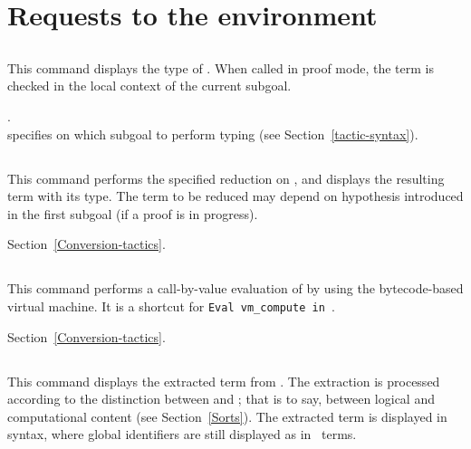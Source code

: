 \section{Requests to the environment}

\subsection[\tt Check {\term}.]{}
This command displays the type of {\term}. When called in proof mode, 
the term is checked in the local context of the current subgoal.

\begin{Variants}
\item {}.\\ %
specifies on which subgoal to perform typing (see
  Section~\ref{tactic-syntax}).
\end{Variants}


\subsection[\tt Eval {\rm\sl convtactic} in {\term}.]{}

This command performs the specified reduction on {\term}, and displays
the resulting term with its type. The term to be reduced may depend on
hypothesis introduced in the first subgoal (if a proof is in
progress).

\SeeAlso Section~\ref{Conversion-tactics}.

\subsection[\tt Compute {\term}.]{}

This command performs a call-by-value evaluation of {\term} by using
the bytecode-based virtual machine. It is a shortcut for
{\tt Eval vm\_compute in {\term}}.

\SeeAlso Section~\ref{Conversion-tactics}.

\subsection[\tt Extraction \term.]{}
This command displays the extracted term from
{\term}. The extraction is processed according to the distinction
between {\Set} and {\Prop}; that is to say, between logical and
computational content (see Section~\ref{Sorts}). The extracted term is
displayed in {\ocaml} syntax, where global identifiers are still
displayed as in \Coq\ terms.

